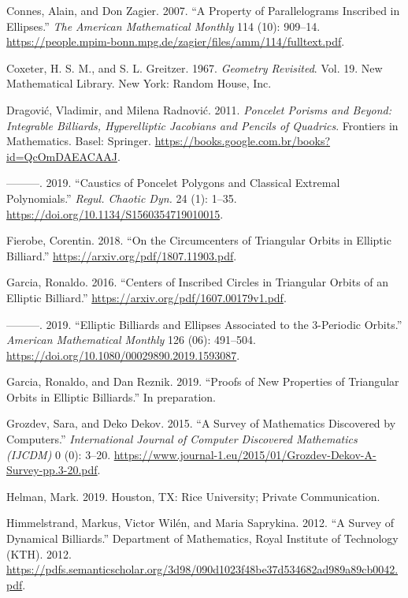 \documentclass[]{article}
\begin{document}
\leavevmode\hypertarget{ref-connes07}{}%
Connes, Alain, and Don Zagier. 2007. ``A Property of Parallelograms Inscribed in Ellipses.'' \emph{The American Mathematical Monthly} 114 (10): 909--14. \url{https://people.mpim-bonn.mpg.de/zagier/files/amm/114/fulltext.pdf}.

\leavevmode\hypertarget{ref-coxeter67}{}%
Coxeter, H. S. M., and S. L. Greitzer. 1967. \emph{Geometry Revisited}. Vol. 19. New Mathematical Library. New York: Random House, Inc.

\leavevmode\hypertarget{ref-dragovic11}{}%
Dragović, Vladimir, and Milena Radnović. 2011. \emph{Poncelet Porisms and Beyond: Integrable Billiards, Hyperelliptic Jacobians and Pencils of Quadrics}. Frontiers in Mathematics. Basel: Springer. \url{https://books.google.com.br/books?id=QcOmDAEACAAJ}.

\leavevmode\hypertarget{ref-dragovic88}{}%
---------. 2019. ``Caustics of Poncelet Polygons and Classical Extremal Polynomials.'' \emph{Regul. Chaotic Dyn.} 24 (1): 1--35. \url{https://doi.org/10.1134/S1560354719010015}.

\leavevmode\hypertarget{ref-corentin19}{}%
Fierobe, Corentin. 2018. ``On the Circumcenters of Triangular Orbits in Elliptic Billiard.'' \url{https://arxiv.org/pdf/1807.11903.pdf}.

\leavevmode\hypertarget{ref-ronaldo16}{}%
Garcia, Ronaldo. 2016. ``Centers of Inscribed Circles in Triangular Orbits of an Elliptic Billiard.'' \url{https://arxiv.org/pdf/1607.00179v1.pdf}.

\leavevmode\hypertarget{ref-ronaldo19}{}%
---------. 2019. ``Elliptic Billiards and Ellipses Associated to the 3-Periodic Orbits.'' \emph{American Mathematical Monthly} 126 (06): 491--504. \url{https://doi.org/10.1080/00029890.2019.1593087}.

\leavevmode\hypertarget{ref-garcia19a}{}%
Garcia, Ronaldo, and Dan Reznik. 2019. ``Proofs of New Properties of Triangular Orbits in Elliptic Billiards.'' In preparation.

\leavevmode\hypertarget{ref-dekov05}{}%
Grozdev, Sara, and Deko Dekov. 2015. ``A Survey of Mathematics Discovered by Computers.'' \emph{International Journal of Computer Discovered Mathematics (IJCDM)} 0 (0): 3--20. \url{https://www.journal-1.eu/2015/01/Grozdev-Dekov-A-Survey-pp.3-20.pdf}.

\leavevmode\hypertarget{ref-helman19}{}%
Helman, Mark. 2019. Houston, TX: Rice University; Private Communication.

\leavevmode\hypertarget{ref-himmelstrand12}{}%
Himmelstrand, Markus, Victor Wilén, and Maria Saprykina. 2012. ``A Survey of Dynamical Billiards.'' Department of Mathematics, Royal Institute of Technology (KTH). 2012. \url{https://pdfs.semanticscholar.org/3d98/090d1023f48be37d534682ad989a89cb0042.pdf}.
\end{document}
